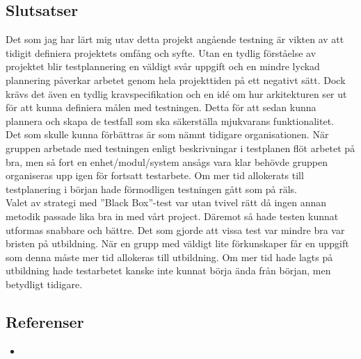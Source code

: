 	\subsection{Slutsatser}
	Det som jag har lärt mig utav detta projekt angående testning är vikten av att tidigit definiera projektets omfång och syfte. Utan en tydlig förståelse av projektet blir testplannering en väldigt svår uppgift och en mindre lyckad plannering påverkar arbetet genom hela projekttiden på ett negativt sätt. Dock krävs det även en tydlig kravspecifikation och en idé om hur arkitekturen ser ut för att kunna definiera målen med testningen. Detta för att sedan kunna plannera och skapa de testfall som ska säkerställa mjukvarans funktionalitet. \\
	
	Det som skulle kunna förbättras är som nämnt tidigare organisationen. När gruppen arbetade med testningen enligt beskrivningar i testplanen flöt arbetet på bra, men så fort en enhet/modul/system ansågs vara klar behövde gruppen organiseras upp igen för fortsatt testarbete. Om mer tid allokerats till testplanering i början hade förmodligen testningen gått som på räls. \\
	
	Valet av strategi med ''Black Box''-test var utan tvivel rätt då ingen annan metodik passade lika bra in med vårt project. Däremot så hade testen kunnat utformas snabbare och bättre. Det som gjorde att vissa test var mindre bra var bristen på utbildning. När en grupp med väldigt lite förkunskaper får en uppgift som denna måste mer tid allokeras till utbildning. Om mer tid hade lagts på utbildning hade testarbetet kanske inte kunnat börja ända från början, men betydligt tidigare.
	
	\subsection{Referenser}
	\begin{itemize}
	\item{}
	\end{itemize}
	
	